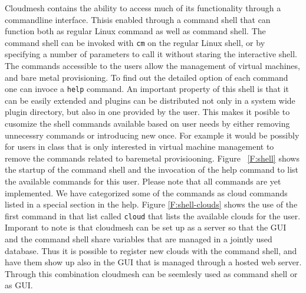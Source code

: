 \documentclass[graybox]{svmult}
\begin{document}
Cloudmesh contains the ability to access  much of its functionality through a commandline interface. Thisis enabled through a command shell that can function both as regular Linux command as well as command shell. The command shell can be invoked with {\tt cm} on the regular Linux shell, or by specifying a number of parameters to call it without staring the interactive shell. The commands accessible to the users allow the management of virtual machines, and bare metal provisioning. To find out the detailed option of each command one can invoce a {\tt help} command. An important property of this shell is that it can be easily extended and plugins can be distributed not only in a system wide plugin directory, but also in one provided by the user. This makes it posible to cusomize the shell commands available based on user needs by either removing unnecessry commands or introducing new once. For example it would be possibly for users in  class that is only interested in virtual machine management to remove the commands related to baremetal provisiooning. Figure ~\ref{F:shell} shows the startup of the command shell and the invocation of the help command to list the available commands for this user. Please note that all commands are yet implemented. We have categorized some of the commands as cloud commands listed in a special section in the help. Figure \ref{F:shell-clouds} shows the use of the first command in that list called {\tt cloud} that lists the available clouds for the user.  Imporant to note is that cloudmesh can be set up as a server so that the GUI and the command shell share variables that are managed in a jointly used database. Thus it is possible to register new clouds with the command shell, and have them show up also in the GUI that is managed through a hosted web server. Through this combination cloudmesh can be seemlesly used as command shell or as GUI.
\end{document}
